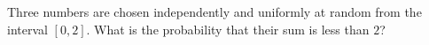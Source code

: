 Three numbers are chosen independently and uniformly at random from the interval $[0,2]$. What is the probability that their sum is less than $2$?
